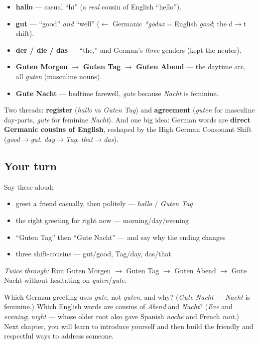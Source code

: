 \begin{grammarlens}[title={What you've built}]
\begin{itemize}
\raggedright
  \item \textbf{hallo} — casual \textquotedblleft{}hi\textquotedblright{} (a \emph{real} cousin of English \textquotedblleft{}hello\textquotedblright{}).
  \item \textbf{gut} — \textquotedblleft{}good\textquotedblright{} \emph{and} \textquotedblleft{}well\textquotedblright{} ($\leftarrow$ Germanic \emph{*gōdaz} = English \emph{good}; the d$\to$t shift).
  \item \textbf{der / die / das} — \textquotedblleft{}the,\textquotedblright{} and German's \emph{three} genders (kept the neuter).
  \item \textbf{Guten Morgen} $\to$ \textbf{Guten Tag} $\to$ \textbf{Guten Abend} — the daytime arc, all \emph{guten} (masculine nouns).
  \item \textbf{Gute Nacht} — bedtime farewell, \emph{gute} because \emph{Nacht} is feminine.
\end{itemize}

Two threads: \textbf{register} (\emph{hallo} vs \emph{Guten Tag}) and \textbf{agreement} (\emph{guten} for masculine day-parts, \emph{gute} for feminine \emph{Nacht}). And one big idea: German words are \textbf{direct Germanic cousins of English}, reshaped by the High German Consonant Shift (\emph{good$\to$gut}, \emph{day$\to$Tag}, \emph{that$\to$das}).
\end{grammarlens}

\subsection*{Your turn}
Say these aloud:

\begin{itemize}
\raggedright
  \item greet a friend casually, then politely — \emph{hallo} / \emph{Guten Tag}
  \item the right greeting for right now — morning/day/evening
  \item \textquotedblleft{}Guten Tag\textquotedblright{} then \textquotedblleft{}Gute Nacht\textquotedblright{} — and say why the ending changes
  \item three shift-cousins — gut/good, Tag/day, das/that
\end{itemize}

\emph{Twice through:} Run Guten Morgen $\to$ Guten Tag $\to$ Guten Abend $\to$ Gute Nacht without hesitating on \emph{guten}/\emph{gute}.

\begin{tcolorbox}[breakable,colback=teal!4,colframe=teal!35!black,title={Before you move on}]
Which German greeting uses \emph{gute}, not \emph{guten}, and why? (\emph{Gute Nacht} — \emph{Nacht} is feminine.) Which English words are cousins of \emph{Abend} and \emph{Nacht}? (\emph{Eve} and \emph{evening}; \emph{night} — whose older root also gave Spanish \emph{noche} and French \emph{nuit}.) Next chapter, you will learn to introduce yourself and then build the friendly and respectful ways to address someone.
\end{tcolorbox}
